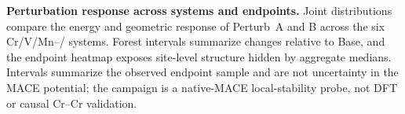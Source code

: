 \textbf{Perturbation response across systems and endpoints.} Joint distributions compare the energy and geometric response of Perturb~A and B across the six Cr/V/Mn--/ systems. Forest intervals summarize changes relative to Base, and the endpoint heatmap exposes site-level structure hidden by aggregate medians. Intervals summarize the observed endpoint sample and are not uncertainty in the MACE potential; the campaign is a native-MACE local-stability probe, not DFT or causal Cr--Cr validation.
